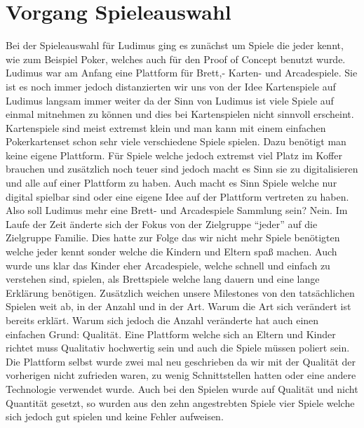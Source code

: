 \section{Vorgang Spieleauswahl}
Bei der Spieleauswahl für Ludimus ging es zunächst um Spiele die jeder kennt, wie zum Beispiel Poker, welches auch für den Proof of Concept benutzt wurde. Ludimus war am Anfang eine Plattform für Brett,- Karten- und Arcadespiele. Sie ist es noch immer jedoch distanzierten wir uns von der Idee Kartenspiele auf Ludimus langsam immer weiter da der Sinn von Ludimus ist viele Spiele auf einmal mitnehmen zu können und dies bei Kartenspielen nicht sinnvoll erscheint. Kartenspiele sind meist extremst klein und man kann mit einem einfachen Pokerkartenset schon sehr viele verschiedene Spiele spielen. Dazu benötigt man keine eigene Plattform. Für Spiele welche jedoch extremst viel Platz im Koffer brauchen und zusätzlich noch teuer sind jedoch macht es Sinn sie zu digitalisieren und alle auf einer Plattform zu haben. Auch macht es Sinn Spiele welche nur digital spielbar sind oder eine eigene Idee auf der Plattform vertreten zu haben. Also soll Ludimus mehr eine Brett- und Arcadespiele Sammlung sein? Nein.
Im Laufe der Zeit änderte sich der Fokus von der Zielgruppe “jeder” auf die Zielgruppe Familie. Dies hatte zur Folge das wir nicht mehr Spiele benötigten welche jeder kennt sonder welche die Kindern und Eltern spaß machen. Auch wurde uns klar das Kinder eher Arcadespiele, welche schnell und einfach zu verstehen sind, spielen, als Brettspiele welche lang dauern und eine lange Erklärung benötigen. Zusätzlich weichen unsere Milestones von den tatsächlichen Spielen weit ab, in der Anzahl und in der Art. Warum die Art sich verändert ist bereits erklärt. Warum sich jedoch die Anzahl veränderte hat auch einen einfachen Grund: Qualität. Eine Plattform welche sich an Eltern und Kinder richtet muss Qualitativ hochwertig sein und auch die Spiele müssen poliert sein. Die Plattform selbst wurde zwei mal neu geschrieben da wir mit der Qualität der vorherigen nicht zufrieden waren, zu wenig Schnittstellen hatten oder eine andere Technologie verwendet wurde. Auch bei den Spielen wurde auf Qualität und nicht Quantität gesetzt, so wurden aus den zehn angestrebten Spiele vier Spiele welche sich jedoch gut spielen und keine Fehler aufweisen.
